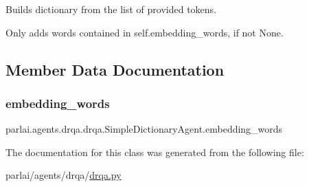\begin{DoxyVerb}Builds dictionary from the list of provided tokens.

Only adds words contained in self.embedding_words, if not None.
\end{DoxyVerb}
 

\subsection{Member Data Documentation}
\mbox{\label{classparlai_1_1agents_1_1drqa_1_1drqa_1_1SimpleDictionaryAgent_a26ce0c0cc3362b43219d488826c3550a}} 
\subsubsection{\texorpdfstring{embedding\+\_\+words}{embedding\_words}}
{\footnotesize\ttfamily parlai.\+agents.\+drqa.\+drqa.\+Simple\+Dictionary\+Agent.\+embedding\+\_\+words}



The documentation for this class was generated from the following file\+:\begin{DoxyCompactItemize}
\item 
parlai/agents/drqa/\hyperlink{drqa_8py}{drqa.\+py}\end{DoxyCompactItemize}

